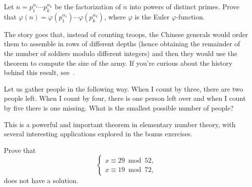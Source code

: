 \begin{bonus}
    Let $n=p_1^{\alpha_1}\cdots p_k^{\alpha_k}$ be the factorization 
    of $n$ into powers of distinct primes. Prove that 
    $\varphi(n)=\varphi(p_1^{\alpha_1})\cdots \varphi(p_k^{\alpha_k})$, where $\varphi$ is the Euler $\varphi$-function. 
\end{bonus}


%

The story goes that, 
instead of counting troops, 
the Chinese generals would order them to 
assemble in rows of different depths 
(hence obtaining the remainder of the number 
of soldiers modulo different integers) and then they 
would use the theorem to 
compute the size of the army. 
If you're curious about the history behind this result,
see~\cite{zbMATH00110338}.

\begin{bonus}
\label{xca:gather_people}
	Let us gather people in the following way. When I 
	count by three, there are two people left. 	When I count by four, 
	there is one person left over and when I count by five there is
	one missing. What is the smallest possible number of people?
\end{bonus}

This is a powerful and important theorem in elementary number theory, with
several interesting applications explored in the bonus exercises.

\begin{bonus}
\label{xca:no_solution}
	Prove that 
	\[
	\begin{cases}
		x\equiv 29\bmod 52,\\
		x\equiv 19\bmod 72,
		\end{cases}
	\]
	does not have a solution.
\end{bonus}

